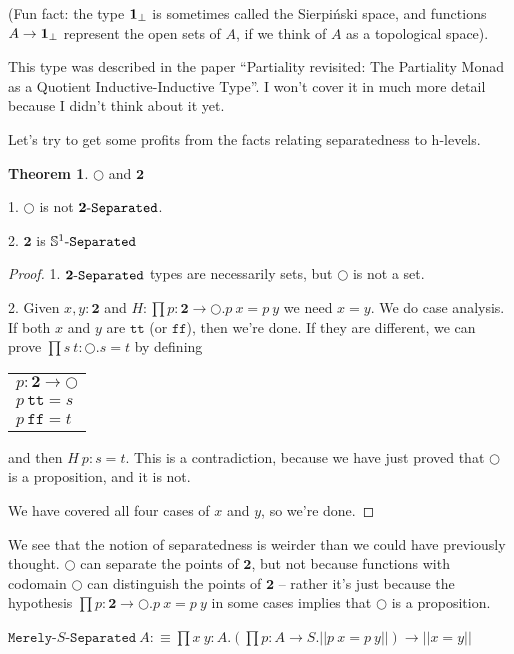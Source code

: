 \documentclass[11pt]{article}
\theoremstyle{definition}
\newtheorem{theorem}{Theorem}[section]
\newcommand{\txt}[1]{\texttt{#1}}
\renewcommand{\(}{\left(}
\renewcommand{\)}{\right)}
\newcommand{\defn}{:\equiv}
\newcommand{\apl}[2]{#1\ #2}
\newcommand{\Unit}{\mathbf{1}}
\newcommand{\Bool}{\mathbf{2}}
\newcommand{\true}{\txt{tt}}
\newcommand{\false}{\txt{ff}}
\newcommand{\dprod}[2]{\prod #1.#2}
\newcommand{\trf}[1]{||#1||}
\begin{document}
(Fun fact: the type $\nonterm{\Unit}$ is sometimes called the Sierpiński space, and functions $A \to \nonterm{\Unit}$ represent the open sets of $A$, if we think of $A$ as a topological space).

This type was described in the paper ``Partiality revisited: The Partiality Monad as a Quotient Inductive-Inductive Type''. I won't cover it in much more detail because I didn't think about it yet.

Let's try to get some profits from the facts relating separatedness to h-levels.

\begin{theorem} $\Circle$ and $\Bool$

1. $\Circle$ is not $\Separated{\Bool}$.

2. $\Bool$ is $\Separated{\Circle}$
\end{theorem}
\begin{proof}

1. $\Separated{\Bool}$ types are necessarily sets, but $\Circle$ is not a set.

2. Given $x, y : \Bool$ and $H : \dprod{p : \Bool \to \Circle}{\apl{p}{x} = \apl{p}{y}}$ we need $x = y$. We do case analysis. If both $x$ and $y$ are $\true$ (or $\false$), then we're done. If they are different, we can prove $\dprod{s\ t : \Circle}{s = t}$ by defining \\

\begin{center}
\begin{tabular}{l}
$p : \Bool \to \Circle$ \\
$\apl{p}{\true} = s$ \\
$\apl{p}{\false} = t$
\end{tabular}
\end{center}

and then $\apl{H}{p} : s = t$. This is a contradiction, because we have just proved that $\Circle$ is a proposition, and it is not.

We have covered all four cases of $x$ and $y$, so we're done.

\end{proof}

We see that the notion of separatedness is weirder than we could have previously thought. $\Circle$ can separate the points of $\Bool$, but not because functions with codomain $\Circle$ can distinguish the points of $\Bool$ -- rather it's just because the hypothesis $\dprod{p : \Bool \to \Circle}{\apl{p}{x} = \apl{p}{y}}$ in some cases implies that $\Circle$ is a proposition.

\newcommand{\MTS}[1]{\txt{Merely}$-$#1$-$\txt{Separated}}
$\displaystyle \apl{\MTS{S}}{A} \defn \dprod{x\ y : A}{\(\dprod{p : A \to S}{\trf{\apl{p}{x} = \apl{p}{y}}}\) \to \trf{x = y}}$
\end{document}
